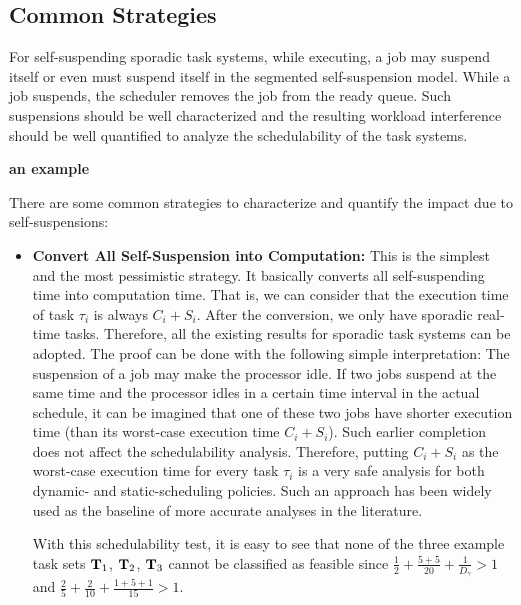 \subsection{Common Strategies}

For self-suspending sporadic task systems, while executing, a job may suspend itself or even must suspend itself in the segmented self-suspension model. While a job suspends, the scheduler removes the job from the ready queue. Such suspensions should be well characterized and the resulting workload interference should be well quantified to analyze the schedulability of the task systems. 

{\bf an example}

There are some common strategies to characterize and quantify the impact due to self-suspensions:
\begin{itemize}
\item {\bf Convert All Self-Suspension into Computation:} This is the simplest and the most pessimistic strategy. It basically converts all self-suspending time into computation time. That is, we can consider that the execution time of task $\tau_i$ is always $C_i+S_i$. After the conversion, we only have sporadic real-time tasks. Therefore, all the existing results for sporadic task systems can be adopted. The proof can be done with the following simple interpretation: The suspension of a job may make the processor idle. If two jobs suspend at the same time and the processor idles in a certain time interval in the actual schedule, it can be imagined that one of these two jobs have shorter execution time (than its worst-case execution time $C_i+S_i$). Such earlier completion does not affect the schedulability analysis. Therefore, putting $C_i+S_i$ as the worst-case execution time for every task $\tau_i$ is a very safe analysis for both dynamic- and static-scheduling policies.  Such an approach has been widely used as the baseline of more accurate analyses in the literature.

With this schedulability test, it is easy to see that none of the three example task sets ${\bf T}_1$, ${\bf T}_2$, ${\bf T}_3$ cannot be classified as feasible since $\frac{1}{2} + \frac{5+5}{20} + \frac{1}{D_\gamma} > 1$ and $\frac{2}{5}+\frac{2}{10}+\frac{1+5+1}{15} > 1$.


\end{itemize}
